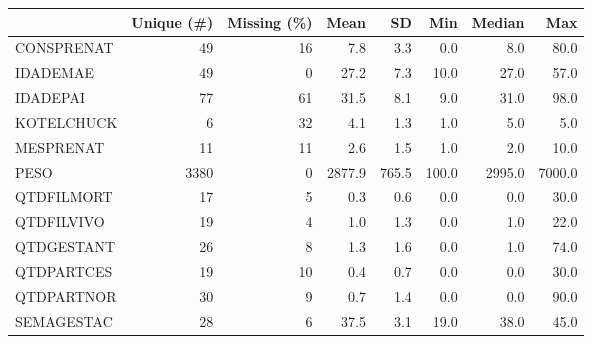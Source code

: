 \begin{table}
\centering
\begin{tabular}[t]{lrrrrrrr}
\toprule
  & Unique (\#) & Missing (\%) & Mean & SD & Min & Median & Max\\
\midrule
CONSPRENAT & 49 & 16 & \num{7.8} & \num{3.3} & \num{0.0} & \num{8.0} & \num{80.0}\\
IDADEMAE & 49 & 0 & \num{27.2} & \num{7.3} & \num{10.0} & \num{27.0} & \num{57.0}\\
IDADEPAI & 77 & 61 & \num{31.5} & \num{8.1} & \num{9.0} & \num{31.0} & \num{98.0}\\
KOTELCHUCK & 6 & 32 & \num{4.1} & \num{1.3} & \num{1.0} & \num{5.0} & \num{5.0}\\
MESPRENAT & 11 & 11 & \num{2.6} & \num{1.5} & \num{1.0} & \num{2.0} & \num{10.0}\\
PESO & 3380 & 0 & \num{2877.9} & \num{765.5} & \num{100.0} & \num{2995.0} & \num{7000.0}\\
QTDFILMORT & 17 & 5 & \num{0.3} & \num{0.6} & \num{0.0} & \num{0.0} & \num{30.0}\\
QTDFILVIVO & 19 & 4 & \num{1.0} & \num{1.3} & \num{0.0} & \num{1.0} & \num{22.0}\\
QTDGESTANT & 26 & 8 & \num{1.3} & \num{1.6} & \num{0.0} & \num{1.0} & \num{74.0}\\
QTDPARTCES & 19 & 10 & \num{0.4} & \num{0.7} & \num{0.0} & \num{0.0} & \num{30.0}\\
QTDPARTNOR & 30 & 9 & \num{0.7} & \num{1.4} & \num{0.0} & \num{0.0} & \num{90.0}\\
SEMAGESTAC & 28 & 6 & \num{37.5} & \num{3.1} & \num{19.0} & \num{38.0} & \num{45.0}\\
\bottomrule
\end{tabular}
\end{table}
